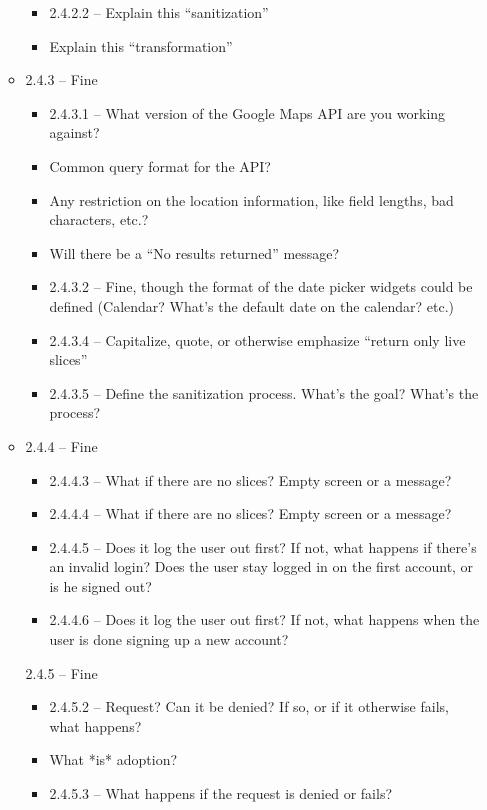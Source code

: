 \documentclass{article}
\begin{document}
\begin{itemize}
\begin{itemize}
\begin{itemize}
            \item 2.4.2.2 -- Explain this ``sanitization''
            \item Explain this ``transformation''
        \end{itemize}
        \item 2.4.3 -- Fine
        \begin{itemize}
            \item 2.4.3.1 -- What version of the Google Maps API are you working against?
            \item Common query format for the API?
            \item Any restriction on the location information, like field lengths, bad characters, etc.?
            \item Will there be a ``No results returned'' message?
            \item 2.4.3.2 -- Fine, though the format of the date picker widgets could be defined (Calendar?  What's the default date on the calendar?  etc.)
            \item 2.4.3.4 -- Capitalize, quote, or otherwise emphasize ``return only live slices''
            \item 2.4.3.5 -- Define the sanitization process.  What's the goal?  What's the process?
        \end{itemize}
        \item 2.4.4 -- Fine
        \begin{itemize}
            \item 2.4.4.3 -- What if there are no slices?  Empty screen or a message?
            \item 2.4.4.4 -- What if there are no slices?  Empty screen or a message?
            \item 2.4.4.5 -- Does it log the user out first?  If not, what happens if there's an invalid login?  Does the user stay logged in on the first account, or is he signed out?
            \item 2.4.4.6 -- Does it log the user out first?  If not, what happens when the user is done signing up a new account?
        \end{itemize}
        2.4.5 -- Fine
        \begin{itemize}
            \item 2.4.5.2 -- Request?  Can it be denied?  If so, or if it otherwise fails, what happens?
            \item What *is* adoption?
            \item 2.4.5.3 -- What happens if the request is denied or fails?

\end{itemize}
\end{itemize}
\end{itemize}
\end{document}
